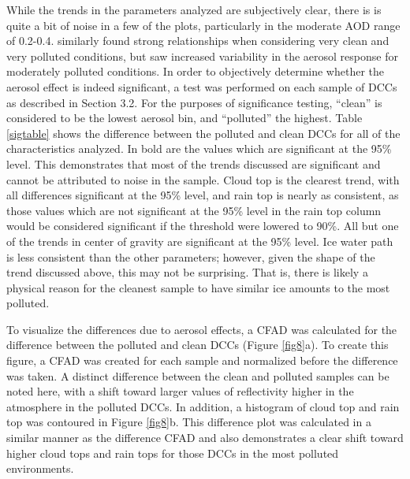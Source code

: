 While the trends in the parameters analyzed are subjectively clear, there is is quite a bit of noise in a few of the plots, particularly in the moderate AOD range of 0.2-0.4.  \citet{rcepaper} similarly found strong relationships when considering very clean and very polluted conditions, but saw increased variability in the aerosol response for moderately polluted conditions.  In order to objectively determine whether the aerosol effect is indeed significant, a test was performed on each sample of DCCs as described in Section 3.2.  For the purposes of significance testing, ``clean'' is considered to be the lowest aerosol bin, and ``polluted'' the highest.  Table \ref{sigtable} shows the difference between the polluted and clean DCCs for all of the characteristics analyzed.  In bold are the values which are significant at the 95\% level.  This demonstrates that most of the trends discussed are significant and cannot be attributed to noise in the sample.  Cloud top is the clearest trend, with all differences significant at the 95\% level, and rain top is nearly as consistent, as those values which are not significant at the 95\% level in the rain top column would be considered significant if the threshold were lowered to 90\%.  All but one of the trends in center of gravity are significant at the 95\% level.  Ice water path is less consistent than the other parameters; however, given the shape of the trend discussed above, this may not be surprising.  That is, there is likely a physical reason for the cleanest sample to have similar ice amounts to the most polluted.   

To visualize the differences due to aerosol effects, a CFAD was calculated for the difference between the polluted and clean DCCs (Figure \ref{fig8}a).  To create this figure, a CFAD was created for each sample and normalized before the difference was taken.  A distinct difference between the clean and polluted samples can be noted here, with a shift toward larger values of reflectivity higher in the atmosphere in the polluted DCCs.  In addition, a histogram of cloud top and rain top was contoured in Figure \ref{fig8}b.  This difference plot was calculated in a similar manner as the difference CFAD and also demonstrates a clear shift toward higher cloud tops and rain tops for those DCCs in the most polluted environments. 


